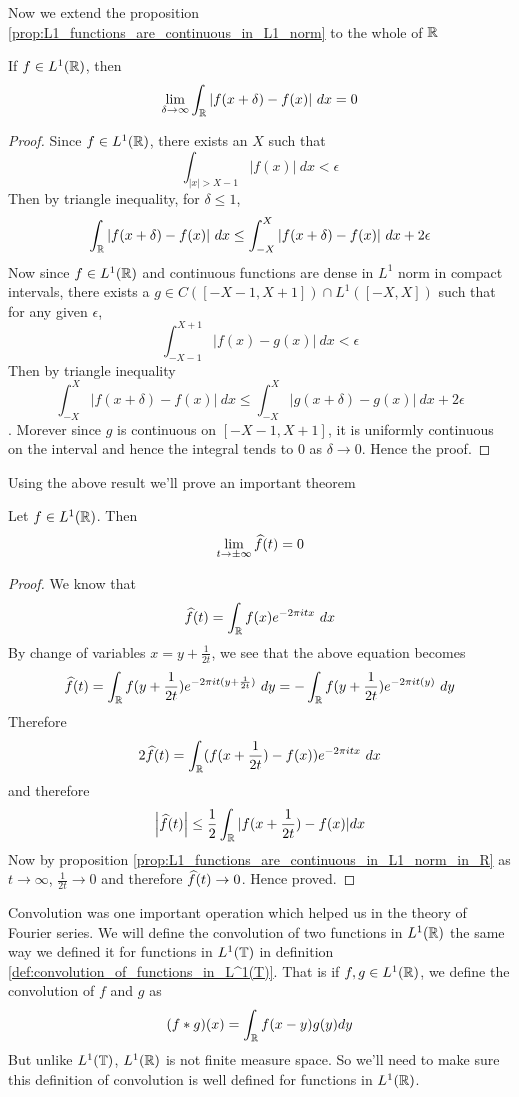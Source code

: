   Now we extend the proposition \ref{prop:L1_functions_are_continuous_in_L1_norm} to the whole of $\mathbb R$
  \begin{proposition}
    \label{prop:L1_functions_are_continuous_in_L1_norm_in_R}
    If $f \in L^1(\mathbb R)$, then $$\lim_{\delta \to \infty} \int_\mathbb R |f(x+\delta) - f(x)| \ dx = 0$$
  \end{proposition}
  \begin{proof}
    Since $f\in L^1(\mathbb R)$, there exists an $X$ such that $$\int_{|x|>X-1} |f(x)| \ dx < \epsilon$$
    Then by triangle inequality, for $\delta \le 1$, $$\int_\mathbb R |f(x+\delta) - f(x)| \ dx \le \int_{-X}^X |f(x+\delta) - f(x)| \ dx + 2\epsilon$$
    Now since $f \in L^1(\mathbb R)$ and continuous functions are dense in $L^1$ norm in compact intervals, there exists a $g \in C([-X-1, X+1]) \cap L^1([-X, X])$ such that for any given $\epsilon$, $$\int_{-X-1}^{X+1} |f(x) - g(x)| \ dx < \epsilon$$
    Then by triangle inequality $$\int_{-X}^X |f(x+\delta) - f(x)| \ dx \le \int_{-X}^X |g(x+\delta) - g(x)| \ dx + 2\epsilon$$. Morever since $g$ is continuous on $[-X-1, X+1]$, it is uniformly continuous on the interval and hence the integral tends to $0$ as $\delta \to 0$. Hence the proof.
  \end{proof}

  Using the above result we'll prove an important theorem
  \begin{theorem}
    Let $f \in L^1(\mathbb R)$. Then $$\lim_{t \to \pm \infty} \widehat{f}(t) = 0$$
  \end{theorem}
  \begin{proof}
    We know that $$\widehat{f}(t) = \int_\mathbb R f(x)e^{-2 \pi itx} \ dx $$
    By change of variables $x = y + \frac{1}{2t}$, we see that the above equation becomes $$\widehat{f}(t) = \int_\mathbb R f(y + \frac{1}{2t})e^{-2 \pi it(y+ \frac{1}{2t})} \ dy = -\int_\mathbb R f(y + \frac{1}{2t})e^{-2 \pi it(y)} \ dy  $$
    Therefore $$2\widehat{f}(t) = \int_\mathbb R (f(x + \frac{1}{2t}) - f(x))e^{-2 \pi itx} \ dx $$
    and therefore $$\left|\widehat{f}(t)\right| \le \frac{1}{2} \int_\mathbb R |f(x + \frac{1}{2t}) - f(x)| dx$$
    Now by proposition \ref{prop:L1_functions_are_continuous_in_L1_norm_in_R} as $t \to \infty$, $\frac{1}{2t} \to 0$ and therefore $\widehat{f}(t) \to 0$. Hence proved. 
  \end{proof}

  Convolution was one important operation which helped us in the theory of Fourier series. We will define the convolution of two functions in $L^1(\mathbb R)$ the same way we defined it for functions in $L^1(\mathbb T)$ in definition \ref{def:convolution_of_functions_in_L^1(T)}. That is if $f, g \in L^1(\mathbb R)$, we define the convolution of $f$ and $g$ as $$(f*g)(x) = \int_{\mathbb R} f(x-y)g(y) dy$$
  But unlike $L^1(\mathbb T)$, $L^1(\mathbb R)$ is not finite measure space. So we'll need to make sure this definition of convolution is well defined for functions in $L^1(\mathbb R)$. 

